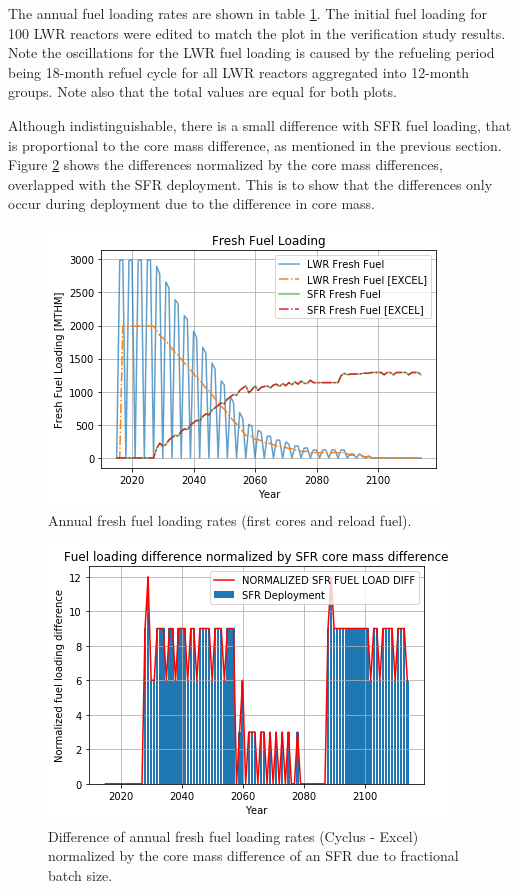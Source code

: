 The annual fuel loading rates are shown in table \ref{fig:fuel_load}.
The initial fuel loading for 100 \gls{LWR} reactors were edited to match
the plot in the verification
study results. Note the oscillations for the \gls{LWR} fuel loading
is caused by the refueling period being 18-month refuel cycle for all \gls{LWR} reactors
aggregated into 12-month groups. Note also that the total values
are equal for both plots.

Although indistinguishable,
there is a small difference with \gls{SFR} fuel loading, that is proportional
to the core mass difference, as mentioned in the previous section.
Figure \ref{fig:fuel_load_diff_norm} shows the
differences normalized by the core mass differences, overlapped with the
\gls{SFR} deployment. This is to show that the differences only occur during
deployment due to the difference in core mass.


\begin{figure}[htbp!]
    \begin{center}
        \includegraphics[scale=0.6]{./images/results_18/fuel_load.png}
    \end{center}
        \caption{Annual fresh fuel loading rates (first cores and reload fuel).}
    \label{fig:fuel_load}
\end{figure}


\begin{figure}[htbp!]
    \begin{center}
        \includegraphics[scale=0.6]{./images/results_18/fuel_load_diff_norm.png}
    \end{center}
        \caption{Difference of annual fresh fuel loading rates (Cyclus - Excel) normalized by the core mass difference of an \gls{SFR} due to fractional batch size.}
    \label{fig:fuel_load_diff_norm}
\end{figure}


